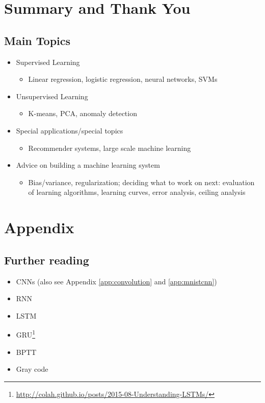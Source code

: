 \documentclass[a4paper,twoside,10pt]{article}
\begin{document}
\section{Summary and Thank You}
\subsection{Main Topics}
\begin{itemize}
  \item Supervised Learning
    \begin{itemize}
      \item Linear regression, logistic regression, neural networks, \acp{SVM}
    \end{itemize}
  \item Unsupervised Learning
    \begin{itemize}
      \item K-means, \ac{PCA}, anomaly detection
    \end{itemize}
  \item Special applications/special topics
    \begin{itemize}
      \item Recommender systems, large scale machine learning
    \end{itemize}
  \item Advice on building a machine learning system
    \begin{itemize}
      \item Bias/variance, regularization; deciding what to work on next: evaluation of learning algorithms, learning curves, error analysis, ceiling analysis
    \end{itemize}
\end{itemize}

\clearpage

\appendix
\section{Appendix}
\subsection{Further reading}
\begin{itemize}
  \item \acp{CNN}\citep{karpathy2016cs231n} (also see Appendix \ref{app:convolution} and \ref{app:mnistcnn})
  \item \ac{RNN}
  \item \ac{LSTM}
  \item \ac{GRU}\footnote{\url{http://colah.github.io/posts/2015-08-Understanding-LSTMs/}}
  \item \ac{BPTT}
  \item Gray code
\end{itemize}
\end{document}
